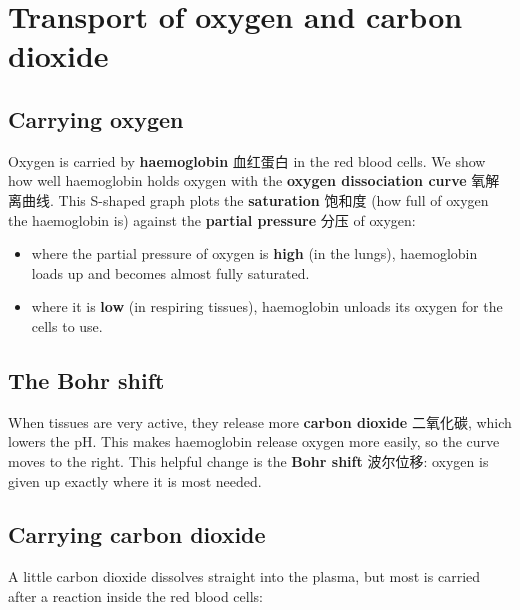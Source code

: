 \documentclass[11pt]{article}
\begin{document}
\section*{Transport of oxygen and carbon dioxide}

\subsection*{Carrying oxygen}

Oxygen is carried by \textbf{haemoglobin} 血红蛋白 in the red blood cells. We show how well haemoglobin holds oxygen with the \textbf{oxygen dissociation curve} 氧解离曲线. This S-shaped graph plots the \textbf{saturation} 饱和度 (how full of oxygen the haemoglobin is) against the \textbf{partial pressure} 分压 of oxygen:

\begin{itemize}
\item where the partial pressure of oxygen is \textbf{high} (in the lungs), haemoglobin loads up and becomes almost fully saturated.

\item where it is \textbf{low} (in respiring tissues), haemoglobin unloads its oxygen for the cells to use.

\end{itemize}

\subsection*{The Bohr shift}

When tissues are very active, they release more \textbf{carbon dioxide} 二氧化碳, which lowers the pH. This makes haemoglobin release oxygen more easily, so the curve moves to the right. This helpful change is the \textbf{Bohr shift} 波尔位移: oxygen is given up exactly where it is most needed.

\subsection*{Carrying carbon dioxide}

A little carbon dioxide dissolves straight into the plasma, but most is carried after a reaction inside the red blood cells:
\end{document}
